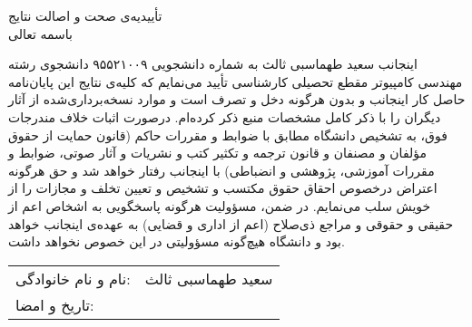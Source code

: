 \newpage
\thispagestyle{empty}

\begin{center}
{\Large
    تأییدیه‌ی صحت و اصالت نتایج \\
}
\vspace{.5cm}
باسمه تعالی
\vspace{.5cm}
\end{center}

اینجانب
سعید طهماسبی ثالث
به شماره دانشجویی
۹۵۵۲۱۰۰۹
دانشجوی رشته
مهندسی کامپیوتر
مقطع تحصیلی
کارشناسی
تأیید می‌نمایم كه كلیه‌ی نتایج این پایان‌نامه حاصل كار اینجانب و بدون هرگونه دخل و تصرف است و موارد نسخه‌برداری‌شده از آثار دیگران را با ذكر كامل مشخصات منبع ذكر كرده‌ام. درصورت اثبات خلاف مندرجات فوق، به تشخیص دانشگاه مطابق با ضوابط و مقررات حاكم (قانون حمایت از حقوق مؤلفان و مصنفان و قانون ترجمه و تكثیر كتب و نشریات و آثار صوتی، ضوابط و مقررات آموزشی، پژوهشی و انضباطی) با اینجانب رفتار خواهد شد و حق هرگونه اعتراض درخصوص احقاق حقوق مكتسب و تشخیص و تعیین تخلف و مجازات را از خویش سلب می‌نمایم. در ضمن، مسؤولیت هرگونه پاسخگویی به اشخاص اعم از حقیقی و حقوقی و مراجع ذی‌صلاح (اعم از اداری و قضایی) به عهده‌ی اینجانب خواهد بود و دانشگاه هیچ‌گونه مسؤولیتی در این خصوص نخواهد داشت.

\vspace{.5cm}
\begin{flushleft}
\begin{tabular}{lr}
نام و نام خانوادگی:   & 	سعید طهماسبی ثالث \\
تاریخ و امضا: & \\
\end{tabular}
\end{flushleft}
\cleardoublepage
